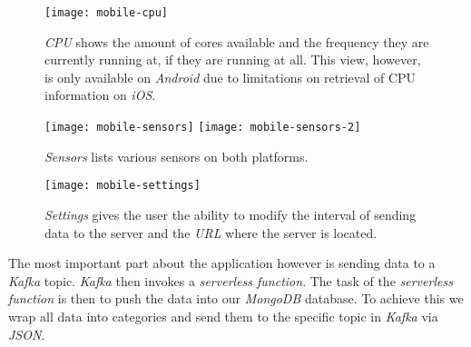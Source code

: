 \begin{figure}[H]
  \centering
  \texttt{[image: mobile-cpu]}
  \caption{\textit{CPU} shows the amount of cores available and the frequency they are currently
  running at, if they are running at all. This view, however, is only available on \textit{Android}
  due to limitations on retrieval of CPU information on \textit{iOS}.}
\end{figure}

\begin{figure}[H]
  \centering
  \texttt{[image: mobile-sensors]}
  \texttt{[image: mobile-sensors-2]}
  \caption{\textit{Sensors} lists various sensors on both platforms.}
\end{figure}

\begin{figure}[H]
  \centering
  \texttt{[image: mobile-settings]}
  \caption{\textit{Settings} gives the user the ability to modify the interval of sending data to the
  server and the \textit{URL} where the server is located.}
\end{figure}

The most important part about the application however is sending data to a \textit{Kafka} topic.
\textit{Kafka} then invokes a \textit{serverless function}. The task of the \textit{serverless
function} is then to push the data into our \textit{MongoDB} database. To achieve this we wrap all
data into categories and send them to the specific topic in \textit{Kafka} via \textit{JSON}.
